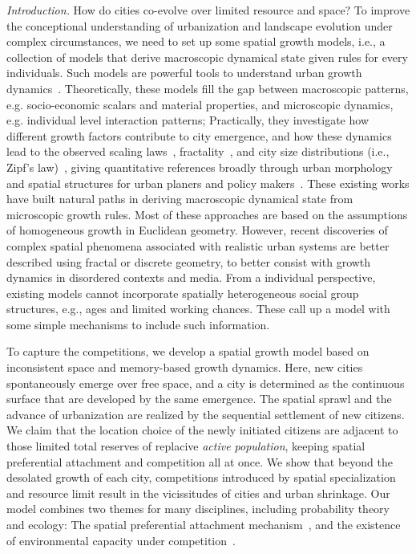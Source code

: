 \documentclass[reprint,unsortedaddress,amsmath,amssymb,aps,prl,showkeys]{revtex4-2}
\begin{document}
\textit{Introduction.} How do cities co-evolve over limited resource and space? To improve the conceptional understanding of urbanization and landscape evolution under complex circumstances, we need to set up some spatial growth models, i.e., a collection of models that derive macroscopic dynamical state given rules for every individuals. Such models are powerful tools to understand urban growth dynamics~\cite{PhysRevX.4.011008, Li2017Simple, makse1995modelling, rybski2013distance, nanda2017spatial}. Theoretically, these models fill the gap between macroscopic patterns, e.g. socio-economic scalars and material properties, and microscopic dynamics, e.g. individual level interaction patterns; Practically, they investigate how different growth factors contribute to city emergence, and how these dynamics lead to the observed scaling laws~\cite{bettencourt2007growth,court2013origins,batty2008size,batty2019urbanscalinglaw}, fractality~\cite{batty1994fractal,batty2007cities}, and city size distributions (i.e., Zipf's law)~\cite{zipf1949human}, giving quantitative references broadly through urban morphology and spatial structures for urban planers and policy makers~\cite{anas1998urban}. These existing works have built natural paths in deriving macroscopic dynamical state from microscopic growth rules. Most of these approaches are based on the assumptions of homogeneous growth in Euclidean geometry. However, recent discoveries of complex spatial phenomena associated with realistic urban systems are better described using fractal or discrete geometry\cite{makse1995modelling,louf2014congestion,PhysRevE.58.7054}, to better consist with growth dynamics in disordered contexts and media. From a individual perspective, existing models cannot incorporate spatially heterogeneous social group structures, e.g., ages\cite{PhysRevE.93.012112} and limited working chances. These call up a model with some simple mechanisms to include such information.

To capture the competitions, we develop a spatial growth model based on inconsistent space and memory-based growth dynamics. Here, new cities spontaneously emerge over free space, and a city is determined as the continuous surface that are developed by the same emergence. The spatial sprawl and the advance of urbanization are realized by the sequential settlement of new citizens. We claim that the location choice of the newly initiated citizens are adjacent to those limited total reserves of replacive \textit{active population}, keeping spatial preferential attachment and competition all at once. We show that beyond the desolated growth of each city, competitions introduced by spatial specialization and resource limit result in the vicissitudes of cities and urban shrinkage. Our model combines two themes for many disciplines, including probability theory and ecology: The spatial preferential attachment mechanism~\cite{Li2017Simple}, and the existence of environmental capacity under competition~\cite{gude2020bacterial,liu2019an}. 
\end{document}

